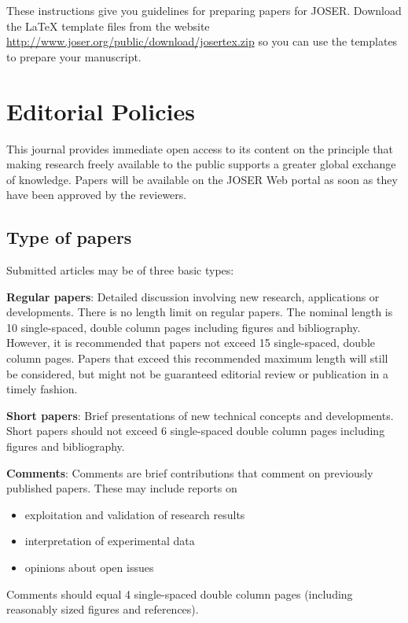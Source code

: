 \documentclass[10pt,journal,compsoc]{joser1}
\begin{document}
These instructions give you guidelines for preparing papers for
JOSER. Download the LaTeX template files from the website
\url{http://www.joser.org/public/download/josertex.zip} so you can use the
templates to prepare your manuscript.

\section{Editorial Policies}
This journal provides immediate open access to its content on the
principle that making research freely available to the public
supports a greater global exchange of knowledge.
Papers will be available on the JOSER Web portal as soon as they have been approved by the
reviewers.

\subsection{Type of papers}
Submitted articles may be of three basic types:

{\bf Regular papers}: Detailed discussion involving new
research, applications or developments. There is no length limit
on regular papers. The nominal length is 10 single-spaced, double
column pages including figures and bibliography. However, it is
recommended that papers not exceed 15 single-spaced, double column
pages. Papers that exceed this recommended maximum length will
still be considered, but might not be guaranteed editorial review
or publication in a timely fashion.

{\bf Short papers}: Brief presentations of new technical concepts
and developments. Short papers should not exceed 6 single-spaced
double column pages including figures and bibliography.

{\bf Comments}: Comments are brief contributions that comment on
previously published papers. These may include reports on

\begin{itemize}
    \item exploitation and validation of research results
    \item interpretation of experimental data
    \item opinions about open issues
\end{itemize}
Comments should equal 4 single-spaced double column pages (including reasonably sized figures and references).
\end{document}
